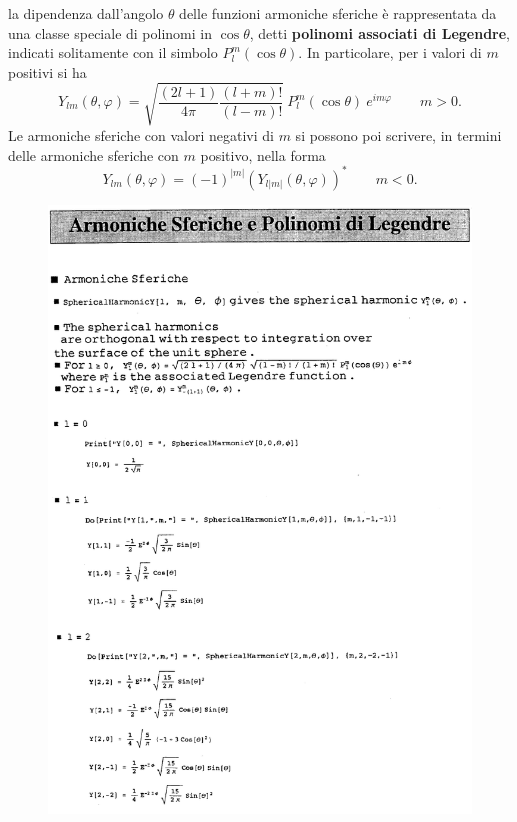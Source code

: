\documentclass[a4paper,12pt,oneside]{book}
\begin{document}
la dipendenza dall'angolo $\theta$ delle funzioni armoniche sferiche è rappresentata da una classe speciale di polinomi in $\cos \theta$, detti \textbf{polinomi associati di Legendre}, indicati solitamente con il simbolo $P_l ^m (\cos \theta)$. In particolare, per i valori di $m$ positivi si ha 
\begin{equation}
Y_{lm} (\theta ,  \varphi ) = \sqrt{\frac{(2l+1)}{4\pi}\frac{(l+m)!}{(l-m)!}}\ P_l ^m (\cos \theta)\ e^{im\varphi}\qquad m>0.
\end{equation}
Le armoniche sferiche con valori negativi di $m$ si possono poi scrivere, in termini delle armoniche sferiche con $m$ positivo, nella forma
\begin{equation}
Y_{lm} (\theta ,  \varphi ) = (-1)^{|m|}\left(Y_{l|m|} (\theta ,  \varphi )\right) ^* \qquad m<0.
\end{equation}
\newpage
\begin{figure}[!htbp]
\begin{center}
\includegraphics[width=\textwidth]{immagini/cap_17/fig_17_1.png}\\
\end{center}
\end{figure}
\end{document}
